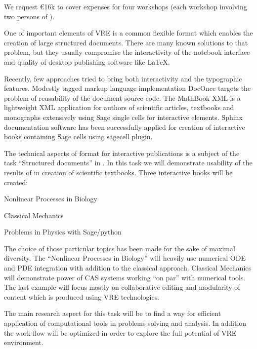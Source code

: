 \begin{workpackage}
\begin{tasklist}
\begin{task}[id=workshop-developing-countries,title=Workshops in developing countries,
PM=6]
We request \euro{16k} to cover expenses for four workshops (each workshop involving
two persons of \TheProject).

\end{task}

\begin{task}[title=Demonstrator: interactive books,
id=ibook,lead=US,PM=30]

One of important elements of VRE is a common flexible format which
enables the creation of large structured documents. There are many
known solutions to that problem, but they usually compromise the
interactivity of the notebook interface and quality of desktop
publishing software like LaTeX. 

Recently, few approaches tried to bring both interactivity and the
typographic features. Modestly tagged markup language implementation
DocOnce targets the problem of reusability of the document source
code. The MathBook XML is a lightweight XML application for authors of
scientific articles, textbooks and monographs extensively using Sage
single cells for interactive elements. Sphinx documentation software
has been successfully applied for creation of interactive books
containing Sage cells using sagecell plugin. 

The technical aspects of format for interactive publications is a
subject of the task ``Structured documents'' in
. In this task we will demonstrate usability
of the results of  in creation of scientific
textbooks. Three interactive books will be created:

\begin{compactitem}
\item Nonlinear Processes in Biology 
\item Classical Mechanics  
\item Problems  in Physics with Sage/python    
\end{compactitem}

The choice of those particular topics has been made for the sake of
maximal diversity. The ``Nonlinear Processes in Biology'' will heavily
use numerical ODE and PDE integration with addition to the classical
approach. Classical Mechanics will demonstrate power of CAS systems
working ``on par'' with numerical tools. The last example will focus
mostly on collaborative editing and modularity of content which is
produced using VRE technologies.

The main research aspect for this task will be to find a way for
efficient application of computational tools in problems solving and
analysis. In addition the work-flow will be optimized in order to
explore the full potential of VRE environment.


\end{task}
\end{tasklist}
\end{workpackage}
